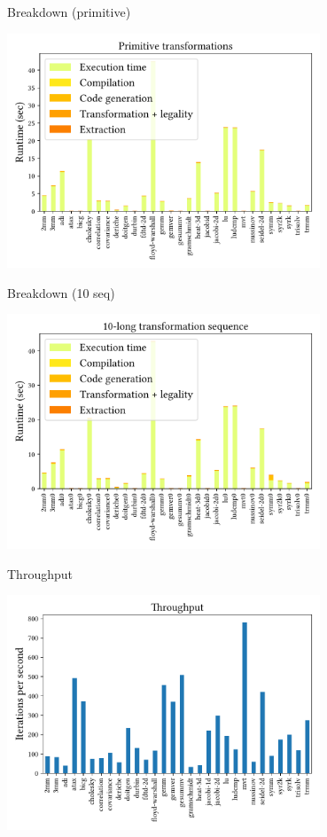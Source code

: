 \documentclass[presentation, aspectratio=169]{beamer}
\begin{document}
\begin{frame}[label={sec:org6d65bd2}]{Breakdown (primitive)}
\begin{center}
\includegraphics[width=0.7\textwidth]{./figs/plot-breakdown-abs-1.pdf}
\end{center}
\end{frame}
\begin{frame}[label={sec:org9e6c436}]{Breakdown (10 seq)}
\begin{center}
\includegraphics[width=0.7\textwidth]{./figs/plot-breakdown-abs-10.pdf}
\end{center}
\end{frame}
\begin{frame}[label={sec:orgb9bee36}]{Throughput}
\begin{center}
\includegraphics[width=0.7\textwidth]{./figs/plot-throughput.pdf}
\end{center}
\end{frame}
\end{document}
